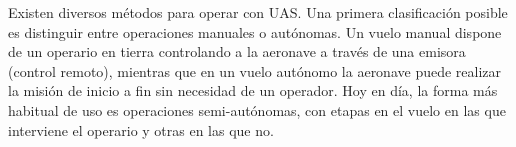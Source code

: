 \documentclass[../main.tex]{subfiles}
\begin{document}
\begin{figure}[ht]
\end{figure}

Existen diversos métodos para operar con UAS. Una primera clasificación posible es distinguir entre operaciones manuales o autónomas. Un vuelo manual dispone de un operario en tierra controlando a la aeronave a través de una emisora (control remoto), mientras que en un vuelo autónomo la aeronave puede realizar la misión de inicio a fin sin necesidad de un operador. Hoy en día, la forma más habitual de uso es operaciones semi-autónomas, con etapas en el vuelo en las que interviene el operario y otras en las que no.
\end{document}
